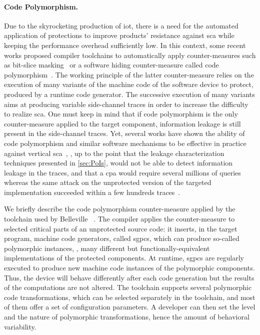 \paragraph{Code Polymorphism.}
Due to the skyrocketing production of \gls{iot}, there is a need for the automated application of protections to improve products’ resistance against \gls{sca} while keeping the performance overhead sufficiently low. 
In this context, some recent works proposed compiler toolchains to automatically apply counter-measures such as bit-slice masking~\cite{belaid_tornado_2020} or a software hiding counter-measure called code polymorphism~\cite{belleville_automated_2019}. 
The working principle of the latter counter-measure relies on the execution of many variants of the machine code of the software device to protect, produced by a runtime code generator. 
The successive execution of many variants aims at producing variable side-channel traces in order to increase the difficulty to realize \gls{sca}. 
One must keep in mind that if code polymorphism is the only counter-measure applied to the target component, information leakage is still present in the side-channel traces. 
Yet, several works have shown the ability of code polymorphism and similar software
mechanisms to be effective in practice against \gls{vertical} \gls{sca}~\cite{agosta_code_2012,courousse_runtime_2016}, \ie{}, up to the point that the leakage characterization techniques presented in \autoref{sec:PoIs}, would not be able to detect information leakage in the traces, and that a \gls{cpa} would require several millions of queries whereas the same attack on the unprotected version of the targeted implementation succeeded within a few hundreds traces~\cite{agosta_meet_2015,belleville_automated_2019}.

We briefly describe the code polymorphism counter-measure applied by the toolchain used by Belleville \etal{}~\cite{belleville_automated_2019}. 
The compiler applies the counter-measure to selected critical parts of an unprotected source code: it inserts, in the target program, machine code generators, called \glspl{sgpc}, which can produce so-called polymorphic instances, \ie{}, many different but functionally-equivalent implementations of the protected components. 
At runtime, \glspl{sgpc} are regularly executed to produce new machine code instances of the polymorphic components. 
Thus, the device will behave differently after each code generation but the results of the computations are not altered. 
The toolchain supports several polymorphic code transformations, which can be selected separately in the toolchain, and most of them offer a set of configuration parameters. 
A developer can then set the level and the nature of polymorphic transformations, hence the amount of behavioral variability.

